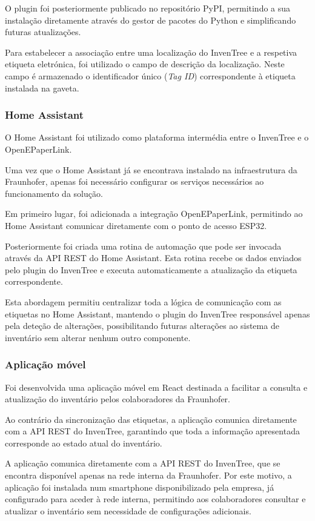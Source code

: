 \documentclass[10pt]{article}
\begin{document}
O plugin foi posteriormente publicado no repositório PyPI, permitindo a sua instalação diretamente através do gestor de pacotes do Python e simplificando futuras atualizações.

Para estabelecer a associação entre uma localização do InvenTree e a respetiva etiqueta eletrónica, foi utilizado o campo de descrição da localização. Neste campo é armazenado o identificador único (\textit{Tag ID}) correspondente à etiqueta instalada na gaveta.

\subsubsection{Home Assistant}

O Home Assistant foi utilizado como plataforma intermédia entre o InvenTree e o OpenEPaperLink.

Uma vez que o Home Assistant já se encontrava instalado na infraestrutura da Fraunhofer, apenas foi necessário configurar os serviços necessários ao funcionamento da solução.

Em primeiro lugar, foi adicionada a integração OpenEPaperLink, permitindo ao Home Assistant comunicar diretamente com o ponto de acesso ESP32.

Posteriormente foi criada uma rotina de automação que pode ser invocada através da API REST do Home Assistant. Esta rotina recebe os dados enviados pelo plugin do InvenTree e executa automaticamente a atualização da etiqueta correspondente.

Esta abordagem permitiu centralizar toda a lógica de comunicação com as etiquetas no Home Assistant, mantendo o plugin do InvenTree responsável apenas pela deteção de alterações, possibilitando futuras alterações ao sistema de inventário sem alterar nenhum outro componente.

\subsubsection{Aplicação móvel}

Foi desenvolvida uma aplicação móvel em React destinada a facilitar a consulta e atualização do inventário pelos colaboradores da Fraunhofer.

Ao contrário da sincronização das etiquetas, a aplicação comunica diretamente com a API REST do InvenTree, garantindo que toda a informação apresentada corresponde ao estado atual do inventário.

A aplicação comunica diretamente com a API REST do InvenTree, que se encontra disponível apenas na rede interna da Fraunhofer. Por este motivo, a aplicação foi instalada num smartphone disponibilizado pela empresa, já configurado para aceder à rede interna, permitindo aos colaboradores consultar e atualizar o inventário sem necessidade de configurações adicionais.
\end{document}
